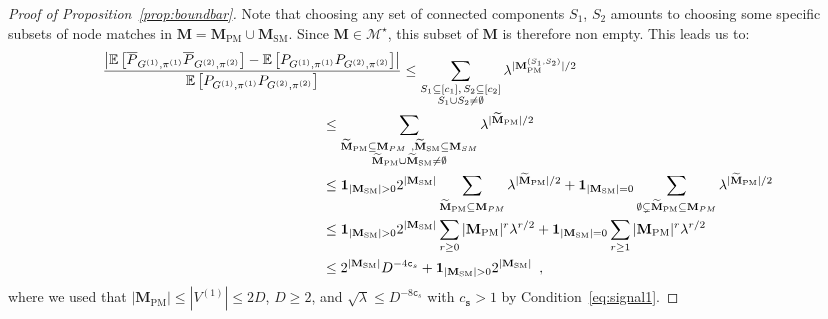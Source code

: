 \documentclass[final]{colt2026}
\newcommand{\1}{\mathbf{1}}
\begin{document}
\begin{proof}[Proof of Proposition~\ref{prop:boundbar}]
Note that choosing any set of connected components $S_1$, $S_2$ amounts to choosing some specific subsets of node matches in $\mathbf M = \mathbf M_{\mathrm{PM}}\cup \mathbf M_{\mathrm{SM}}$. Since $\mathbf{M}\in \mathcal{M}^\star$, this subset of $\mathbf M$ is therefore non empty. This leads us to:
\begin{align*}
    \frac{\left|\mathbb{E}\left[\overline{P}_{G^{(1)}, \pi^{(1)}}\overline{P}_{G^{(2)}, \pi^{(2)}}\right] - \mathbb{E}\left[P_{G^{(1)}, \pi^{(1)}}P_{G^{(2)}, \pi^{(2)}}\right]\right|}{\mathbb{E}\left[P_{G^{(1)}, \pi^{(1)}}P_{G^{(2)}, \pi^{(2)}}\right]}&\leq  \sum_{\substack{S_1 \subseteq [c_1], \, S_2 \subseteq [c_2]\\ S_1\cup S_2\neq \emptyset}} \lambda^{|\mathbf M_{\mathrm{PM}}^{(S_1,S_2)}|/2}\\
    &\hspace{-2cm}\leq \sum_{\substack{\widetilde{\mathbf M}_{\mathrm{PM}} \subseteq \mathbf M_{PM} \ , \widetilde{\mathbf M}_{\mathrm{SM}} \subseteq \mathbf M_{SM} 
    \\  
    \widetilde{\mathbf M}_{\mathrm{PM}}\cup \widetilde{\mathbf M}_{\mathrm{SM}}\neq \emptyset}
    } \lambda^{|\widetilde{\mathbf M}_{\mathrm{PM}}|/2}\\
    & \hspace{-2cm} \leq \mathbf{1}_{|\mathbf M_{\mathrm{SM}}|>0}2^{|\mathbf M_{\mathrm{SM}}|}\sum_{\widetilde{\mathbf M}_{\mathrm{PM}} \subseteq \mathbf M_{PM}} \lambda^{|\widetilde{\mathbf M}_{\mathrm{PM}}|/2}+ \mathbf{1}_{|\mathbf M_{\mathrm{SM}}|=0} \sum_{\emptyset \subsetneq\widetilde{\mathbf M}_{\mathrm{PM}} \subseteq \mathbf M_{PM}} \lambda^{|\widetilde{\mathbf M}_{\mathrm{PM}}|/2}\\
    &\hspace{-2cm} \leq \mathbf{1}_{|\mathbf M_{\mathrm{SM}}|>0} 2^{|\mathbf M_{\mathrm{SM}}|}\sum_{r \geq 0} |\mathbf M_{\mathrm{PM}}|^r \lambda^{r/2} +  \mathbf{1}_{|\mathbf M_{\mathrm{SM}}|=0}\sum_{r \geq 1} |\mathbf M_{\mathrm{PM}}|^r \lambda^{r/2} \\ &  \hspace{-2cm} 
    \leq 2^{|\mathbf M_{\mathrm{SM}}|}D^{-4\texttt{c}_s} + \mathbf{1}_{|\mathbf M_{\mathrm{SM}}|>0} 2^{|\mathbf M_{\mathrm{SM}}|} \enspace ,
\end{align*}
where we used that $|\mathbf M_{\mathrm{PM}}| \leq |V^{(1)}| \leq  2D$, $D\geq 2$, and $\sqrt{\lambda}  \leq D^{-8\texttt{c}_s}$ with $c_{\texttt{s}}>1$ by Condition~\ref{eq:signal1}.





\end{proof}
\end{document}
